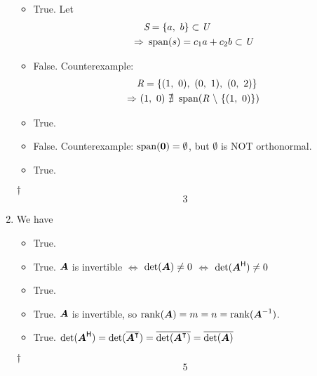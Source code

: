 \documentclass[a4paper,12pt]{article}
\begin{document}
\begin{enumerate}
\begin{itemize}
        \item True. Let \begin{equation}
            \begin{aligned}
                & \textit{S} = \{a, \ b\} \subset \textit{U} \\
                \Rightarrow & \ \operatorname{span}(s) = c_1a + c_2b \subset \textit{U}
            \end{aligned}
        \end{equation}
        \item False. Counterexample: \begin{equation}
            \begin{aligned}
                & \spc{R} = \{(1, \ 0), \ (0, \ 1), \ (0, \ 2)\} \\
                \Rightarrow & \ (1, \ 0) \ \nexists \ \spn(\spc{R} \ \backslash \ \{(1, \ 0)\} )                
            \end{aligned}
        \end{equation}
        \item True.
        \item False. Counterexample: $\operatorname{span}(\boldsymbol{0}) = \emptyset$, but $\emptyset$ is NOT orthonormal.
        \item True.
    \end{itemize}
    \begin{answer}{$\dag$}\begin{equation}
            3    
        \end{equation}
    \end{answer}
    \item We have \begin{itemize}
        \item True.
        \item True. $\boldsymbol{A}$ is invertible $\iff$ $\det(\boldsymbol{A}) \neq 0$ $\iff$ $\det(\boldsymbol{A}^{\mathsf{H}}) \neq 0$
        \item True.
        \item True. $\boldsymbol{A}$ is invertible, so $\operatorname{rank}(\boldsymbol{A}) = m = n = \operatorname{rank}(\boldsymbol{A}^{-1})$.
        \item True. $\det(\boldsymbol{A}^{\mathsf{H}}) = \det(\overline{\boldsymbol{A}^\intercal}) = \overline{\det(\boldsymbol{A}^\intercal)} = \overline{\det(\boldsymbol{A})}$
    \end{itemize}
    \begin{answer}{$\dag$}\begin{equation}
            5   
        \end{equation}
    \end{answer}

\end{enumerate}
\end{document}
